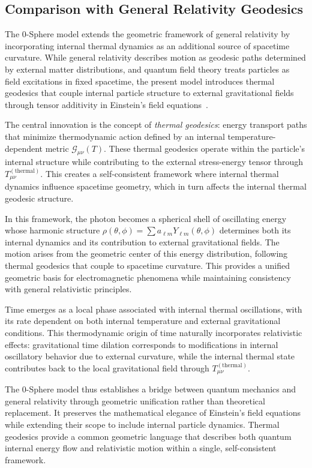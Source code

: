 \documentclass[%
 reprint,
 amsmath,amssymb,
 aps,
]{revtex4-1}
\numberwithin{equation}{section}%
\begin{document}
\subsection{Comparison with General Relativity Geodesics}
\label{subsec:comparison_gr_geodesics}

The 0-Sphere model extends the geometric framework of general relativity by incorporating internal thermal dynamics as an additional source of spacetime curvature. While general relativity describes motion as geodesic paths determined by external matter distributions, and quantum field theory treats particles as field excitations in fixed spacetime, the present model introduces thermal geodesics that couple internal particle structure to external gravitational fields through tensor additivity in Einstein's field equations~\cite{wald1984}.

The central innovation is the concept of \textit{thermal geodesics}: energy transport paths that minimize thermodynamic action defined by an internal temperature-dependent metric $\mathcal{G}_{\mu\nu}(T)$. These thermal geodesics operate within the particle's internal structure while contributing to the external stress-energy tensor through $T_{\mu\nu}^{(\text{thermal})}$. This creates a self-consistent framework where internal thermal dynamics influence spacetime geometry, which in turn affects the internal thermal geodesic structure.

In this framework, the photon becomes a spherical shell of oscillating energy whose harmonic structure $\rho(\theta,\phi) = \sum a_{\ell m} Y_{\ell m}(\theta,\phi)$ determines both its internal dynamics and its contribution to external gravitational fields. The motion arises from the geometric center of this energy distribution, following thermal geodesics that couple to spacetime curvature. This provides a unified geometric basis for electromagnetic phenomena while maintaining consistency with general relativistic principles.

Time emerges as a local phase associated with internal thermal oscillations, with its rate dependent on both internal temperature and external gravitational conditions. This thermodynamic origin of time naturally incorporates relativistic effects: gravitational time dilation corresponds to modifications in internal oscillatory behavior due to external curvature, while the internal thermal state contributes back to the local gravitational field through $T_{\mu\nu}^{(\text{thermal})}$.

The 0-Sphere model thus establishes a bridge between quantum mechanics and general relativity through geometric unification rather than theoretical replacement. It preserves the mathematical elegance of Einstein's field equations while extending their scope to include internal particle dynamics. Thermal geodesics provide a common geometric language that describes both quantum internal energy flow and relativistic motion within a single, self-consistent framework.
\end{document}
